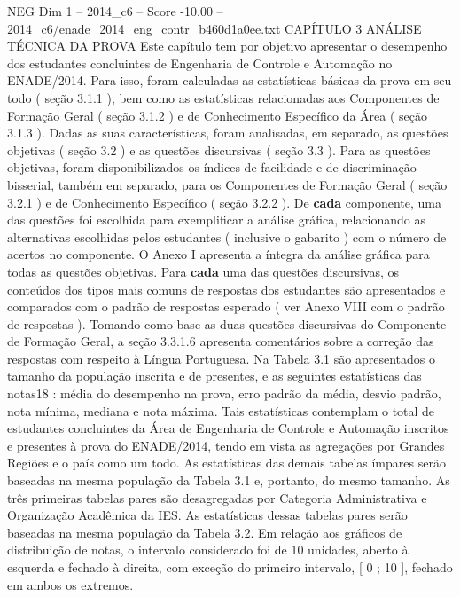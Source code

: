 \begin{textsample}{NEG Dim 1 – 2014\_c6 – Score -10.00 – 2014\_c6/enade\_2014\_eng\_contr\_b460d1a0ee.txt}  \label{ex:f1_neg_004}
CAPÍTULO 3 ANÁLISE TÉCNICA DA PROVA Este capítulo tem por objetivo apresentar o desempenho dos estudantes concluintes de Engenharia de Controle e Automação no ENADE/2014.
Para isso, foram calculadas as estatísticas básicas da prova em seu todo ( seção 3.1.1 ), bem como as estatísticas relacionadas aos Componentes de Formação Geral ( seção 3.1.2 ) e de Conhecimento Específico da Área ( seção 3.1.3 ).
Dadas as suas características, foram analisadas, em separado, as questões objetivas ( seção 3.2 ) e as questões discursivas ( seção 3.3 ).
Para as questões objetivas, foram disponibilizados os índices de facilidade e de discriminação bisserial, também em separado, para os Componentes de Formação Geral ( seção 3.2.1 ) e de Conhecimento Específico ( seção 3.2.2 ).
De \textbf{cada} componente, uma das questões foi escolhida para exemplificar a análise gráfica, relacionando as alternativas escolhidas pelos estudantes ( inclusive o gabarito ) com o número de acertos no componente.
O Anexo I apresenta a íntegra da análise gráfica para todas as questões objetivas.
Para \textbf{cada} uma das questões discursivas, os conteúdos dos tipos mais comuns de respostas dos estudantes são apresentados e comparados com o padrão de respostas esperado ( ver Anexo VIII com o padrão de respostas ).
Tomando como base as duas questões discursivas do Componente de Formação Geral, a seção 3.3.1.6 apresenta comentários sobre a correção das respostas com respeito à Língua Portuguesa.
Na Tabela 3.1 são apresentados o tamanho da população inscrita e de presentes, e as seguintes estatísticas das notas18 : média do desempenho na prova, erro padrão da média, desvio padrão, nota mínima, mediana e nota máxima.
Tais estatísticas contemplam o total de estudantes concluintes da Área de Engenharia de Controle e Automação inscritos e presentes à prova do ENADE/2014, tendo em vista as agregações por Grandes Regiões e o país como um todo.
As estatísticas das demais tabelas ímpares serão baseadas na mesma população da Tabela 3.1 e, portanto, do mesmo tamanho.
As três primeiras tabelas pares são desagregadas por Categoria Administrativa e Organização Acadêmica da IES.
As estatísticas dessas tabelas pares serão baseadas na mesma população da Tabela 3.2.
Em relação aos gráficos de distribuição de notas, o intervalo considerado foi de 10 unidades, aberto à esquerda e fechado à direita, com exceção do primeiro intervalo, [ 0 ; 10 ], fechado em ambos os extremos.

\end{textsample}
